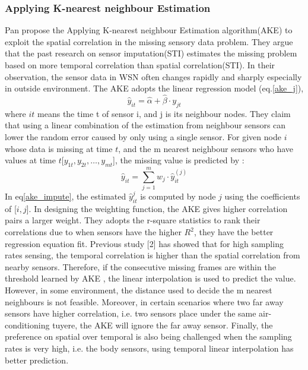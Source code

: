  \subsubsection{Applying K-nearest neighbour Estimation}
Pan\cite{pan2010k} propose the Applying K-nearest neighbour Estimation algorithm(AKE) to exploit the spatial correlation in the missing sensory data problem. They argue that the past research on sensor imputation(STI) estimates the missing problem based on more temporal correlation than spatial correlation(STI). In their observation, the sensor data in WSN often changes rapidly and sharply especially in outside environment. The AKE adopts the linear regression model (eq.\ref{ake_j}),
\begin{equation}
\hat{y}_{it} =\hat{\alpha} +\hat{\beta}\cdot y_{jt}
\label{ake_j}
\end{equation}
 where $it$ means the time t of sensor i,  and j is its neighbour nodes.  
They claim that using a linear combination of the estimation from neighbour sensors can lower the random error caused by only using a single sensor. 
For given node $i$ whose data is missing at time $t$, and the m nearest neighbour sensors who have values at time $t$[$y_{1t}, y_{2t},\dots, y_{mt}$], the missing value is predicted by :   
 \begin{equation}
 \hat{y}_{it} =\sum_{j=1}^m w_j \cdot \hat{y}_{it}^{(j)}
 \label{ake_impute}
 \end{equation}
%
In eq\ref{ake_impute}, the estimated $\hat{y}_{it}^{j}$ is computed by node $j$ using the coefficients of [$i,j$]. In designing the weighting function, the AKE gives higher correlation pairs a larger weight. They adopts the r-square statistics to rank their correlations due to when sensors have the higher $R^2$, they have the better regression equation fit. 
Previous study [2] has showed that for high sampling rates sensing, the temporal correlation is higher than the spatial correlation from nearby sensors. 
Therefore, if the consecutive missing frames are within the threshold learned by AKE , the linear interpolation is used to predict the value. 
However, in some environment, the distance used to decide the m nearest neighbours is not feasible. 
Moreover, in certain scenarios where two far away sensors have higher correlation, i.e. two sensors place under the same air-conditioning tuyere, the AKE will ignore the far away sensor.
Finally, the preference on spatial over temporal is also being challenged when the sampling rates is very high, i.e. the body sensors, using temporal linear interpolation has better prediction.   
